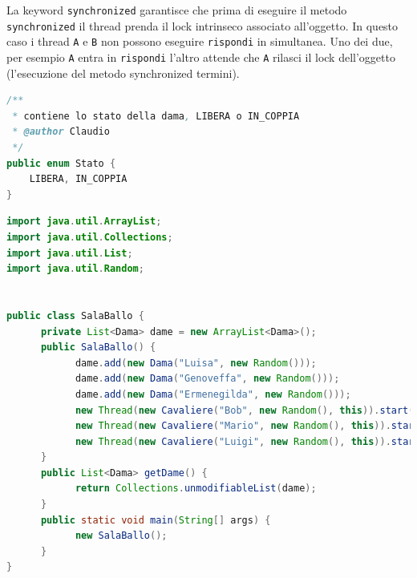 \documentclass{article}
\begin{document}
La keyword \texttt{synchronized} garantisce che prima di eseguire il metodo \texttt{synchronized}  il thread prenda il lock intrinseco associato all'oggetto. In questo caso i thread \texttt{A} e \texttt{B} non possono eseguire \texttt{rispondi} in simultanea. Uno dei due, per esempio \texttt{A} entra in \texttt{rispondi} l'altro attende che \texttt{A} rilasci il lock dell'oggetto (l'esecuzione del metodo synchronized termini).

\begin{lstlisting}[language=Java]
/**
 * contiene lo stato della dama, LIBERA o IN_COPPIA
 * @author Claudio
 */
public enum Stato {
	LIBERA, IN_COPPIA
}
\end{lstlisting}
\begin{lstlisting}[language=Java]
import java.util.ArrayList;
import java.util.Collections;
import java.util.List;
import java.util.Random;


public class SalaBallo {
      private List<Dama> dame = new ArrayList<Dama>();
      public SalaBallo() {
            dame.add(new Dama("Luisa", new Random()));
            dame.add(new Dama("Genoveffa", new Random()));
            dame.add(new Dama("Ermenegilda", new Random()));
            new Thread(new Cavaliere("Bob", new Random(), this)).start();
            new Thread(new Cavaliere("Mario", new Random(), this)).start();
            new Thread(new Cavaliere("Luigi", new Random(), this)).start();
      }
      public List<Dama> getDame() {
            return Collections.unmodifiableList(dame);
      }
      public static void main(String[] args) {
            new SalaBallo();
      } 
}
\end{lstlisting}
\end{document}
